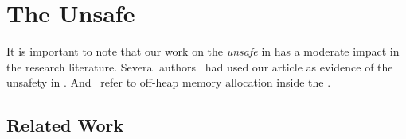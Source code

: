 
\chapter{The \java{} Unsafe \api{}} \label{cha:unsafe}


It is important to note that our work on the \emph{unsafe} \api{} in \java{} has a moderate impact in the research literature.
Several authors~
\cite{staicu_understanding_2017,jiang_unsupervised_2017,zhang_accepting_2016,saied_cooperative_2016,hora_when_2016,li_accessing_2016,holzinger_-depth_2016} had used our article as evidence of the unsafety in \java{}.
And~\cite{bruno_ng2c:_2017} refer to off-heap memory allocation inside the \jvm{}.

\section{Related Work}
